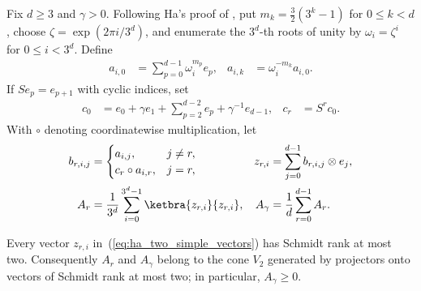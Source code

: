 \begin{definition}
    \label{def:ha_root_average}
    \leanok
    Fix $d\ge3$ and $\gamma>0$. Following Ha's proof of
    \cite[Theorem~2.1]{Ha1998AtomicPositiveMaps}, put
    $m_k=\frac32(3^k-1)$ for $0\le k<d$, choose
    $\zeta=\exp(2\pi i/3^d)$, and enumerate the $3^d$-th roots of unity by
    $\omega_i=\zeta^i$ for $0\le i<3^d$. Define
    \begin{align}
        a_{i,0}
         & =\sum_{p=0}^{d-1}\omega_i^{m_p}e_p,
         &
        a_{i,k}
         & =\omega_i^{-m_k}a_{i,0}.
        \label{eq:ha_phase_vectors}
    \end{align}
    If $S e_p=e_{p+1}$ with cyclic indices, set
    \begin{align}
        c_0
         & =e_0+\gamma e_1+\sum_{p=2}^{d-2}e_p+\gamma^{-1}e_{d-1},
         &
        c_r
         & =S^r c_0.
        \label{eq:ha_cyclic_vectors}
    \end{align}
    With $\circ$ denoting coordinatewise multiplication, let
    \begin{align}
        b_{r,i,j}
         & =\begin{cases}
                a_{i,j},          & j\ne r, \\
                c_r\circ a_{i,r}, & j=r,
            \end{cases}
         &
        z_{r,i}
         & =\sum_{j=0}^{d-1}b_{r,i,j}\otimes e_j,
        \label{eq:ha_two_simple_vectors}                              \\
        A_r
         & =\frac{1}{3^d}\sum_{i=0}^{3^d-1}\ketbra{z_{r,i}}{z_{r,i}},
         &
        A_\gamma
         & =\frac1d\sum_{r=0}^{d-1}A_r.
        \label{eq:ha_root_average}
    \end{align}
\end{definition}

\begin{theorem}
    \label{thm:ha_root_average_two_simple}
    \leanok
    Every vector $z_{r,i}$ in~(\ref{eq:ha_two_simple_vectors}) has Schmidt
    rank at most two. Consequently $A_r$ and $A_\gamma$ belong to the cone
    $V_2$ generated by projectors onto vectors of Schmidt rank at most two;
    in particular, $A_\gamma\ge0$.
\end{theorem}

